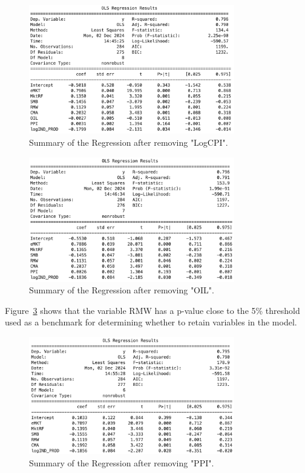 \documentclass[12pt, openright, oneside]{report}
\begin{document}
\begin{figure}[h!]
    \centering
    \includegraphics[width=0.8\textwidth]{images/LogCPI2.png}
    \caption{Summary of the Regression after removing "LogCPI".}\label{fig:CPI2}
\end{figure} 

\begin{figure}[h!]
    \centering
    \includegraphics[width=0.8\textwidth]{images/OIL3.png}
    \caption{Summary of the Regression after removing "OIL".}\label{fig:OIL3}
\end{figure}
Figure~\ref{fig:PPI4} shows that the variable RMW has a p-value close to the 5\% threshold used as a benchmark for
determining whether to retain variables in the model. 

 \begin{figure}[h!]
    \centering
    \includegraphics[width=0.8\textwidth]{images/PPI4.png}
    \caption{Summary of the Regression after removing "PPI".}\label{fig:PPI4}
\end{figure}
\end{document}
